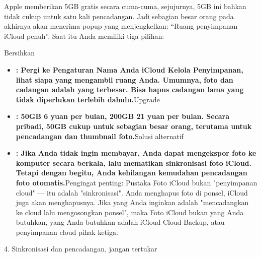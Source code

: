 
Apple memberikan 5GB gratis secara cuma-cuma, sejujurnya, 5GB ini bahkan tidak cukup untuk satu kali pencadangan. Jadi sebagian besar orang pada akhirnya akan menerima popup yang menjengkelkan: “Ruang penyimpanan iCloud penuh”. Saat itu Anda memiliki tiga pilihan:

Bersihkan

\begin{itemize}
  \item \textbf{: Pergi ke Pengaturan Nama Anda iCloud Kelola Penyimpanan, lihat siapa yang mengambil ruang Anda. Umumnya, foto dan cadangan adalah yang terbesar. Bisa hapus cadangan lama yang tidak diperlukan terlebih dahulu.}Upgrade
  \item \textbf{: 50GB 6 yuan per bulan, 200GB 21 yuan per bulan. Secara pribadi, 50GB cukup untuk sebagian besar orang, terutama untuk pencadangan dan thumbnail foto.}Solusi alternatif
  \item \textbf{: Jika Anda tidak ingin membayar, Anda dapat mengekspor foto ke komputer secara berkala, lalu mematikan sinkronisasi foto iCloud. Tetapi dengan begitu, Anda kehilangan kemudahan pencadangan foto otomatis.}Pengingat penting: Pustaka Foto iCloud bukan "penyimpanan cloud" — itu adalah "sinkronisasi". Anda menghapus foto di ponsel, iCloud juga akan menghapusnya. Jika yang Anda inginkan adalah "mencadangkan ke cloud lalu mengosongkan ponsel", maka Foto iCloud bukan yang Anda butuhkan, yang Anda butuhkan adalah iCloud Cloud Backup, atau penyimpanan cloud pihak ketiga.
\end{itemize}

4. Sinkronisasi dan pencadangan, jangan tertukar

